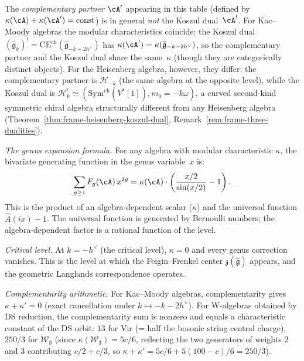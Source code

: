 \begin{remark}\label{rem:complementary-vs-koszul-dual}
The \emph{complementary partner} $\cA'$ appearing in this table
(defined by $\kappa(\cA) + \kappa(\cA') = \text{const}$) is in
general \emph{not} the Koszul dual~$\cA^!$.
For Kac--Moody algebras the modular characteristics coincide:
the Koszul dual $(\widehat{\mathfrak{g}}_k)^!
= \mathrm{CE}^{\mathrm{ch}}(\widehat{\mathfrak{g}}_{-k-2h^\vee})$
has $\kappa(\cA^!) = \kappa(\widehat{\mathfrak{g}}_{-k-2h^\vee})$,
so the complementary partner and the Koszul dual share the
same~$\kappa$ (though they are categorically distinct objects).
For the Heisenberg algebra, however,
they differ: the complementary partner is $\mathcal{H}_{-k}$
(the same algebra at the opposite level), while the Koszul dual is
$\mathcal{H}_k^!\simeq
(\mathrm{Sym}^{\mathrm{ch}}(V^*[1]),m_0=-k\omega)$, a curved
second-kind symmetric chiral algebra structurally different from any
Heisenberg algebra
(Theorem~\ref{thm:frame-heisenberg-koszul-dual},
Remark~\ref{rem:frame-three-dualities}).
\end{remark}

\emph{The genus expansion formula.}
For any algebra with modular characteristic $\kappa$, the bivariate generating function in the genus variable~$x$ is:
\[
\sum_{g \geq 1} F_g(\cA)\, x^{2g}
= \kappa(\cA) \cdot \left(\frac{x/2}{\sin(x/2)} - 1\right).
\]
This is the product of an algebra-dependent scalar ($\kappa$) and the universal function $\hat{A}(ix) - 1$. The universal function is generated by Bernoulli numbers; the algebra-dependent factor is a rational function of the level.

\emph{Critical level.}
At $k = -h^\vee$ (the critical level), $\kappa = 0$ and every genus correction vanishes. This is the level at which the Feigin--Frenkel center $\mathfrak{z}(\widehat{\mathfrak{g}})$ appears, and the geometric Langlands correspondence operates.

\emph{Complementarity arithmetic.}
For Kac--Moody algebras, complementarity gives $\kappa + \kappa' = 0$ (exact cancellation under $k \mapsto -k - 2h^\vee$). For W-algebras obtained by DS reduction, the complementarity sum is nonzero and equals a characteristic constant of the DS orbit: $13$ for $\mathrm{Vir}$ (= half the bosonic string central charge), $250/3$ for $\mathcal{W}_3$ (since $\kappa(\mathcal{W}_3) = 5c/6$, reflecting the two generators of weights $2$ and $3$ contributing $c/2 + c/3$, so $\kappa + \kappa' = 5c/6 + 5(100-c)/6 = 250/3$).


